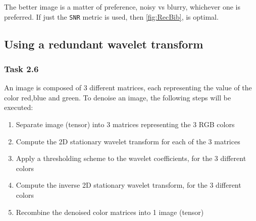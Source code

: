 \documentclass[a4paper]{article}
\begin{document}
	The better image is a matter of preference, noisy vs blurry, whichever one is preferred. If just the \texttt{SNR} metric is used, then \cref{fig:RecBib}, is optimal.
	

	
	
    \subsection{Using a redundant wavelet transform}

    \subsubsection{Task 2.6}

	An image is composed of 3 different matrices, each representing the value of the color red,blue and green. To denoise an image, the following steps will be executed:
\begin{enumerate}
	\item Separate image (tensor) into 3 matrices representing the 3 RGB colors
	\item Compute the 2D stationary wavelet transform for each of the 3 matrices
	\item Apply a thresholding scheme to the wavelet coefficients, for the 3 different colors
	\item Compute the inverse 2D stationary wavelet transform, for the 3 different colors
	\item Recombine the denoised color matrices into 1 image (tensor)
\end{enumerate}
\end{document}
